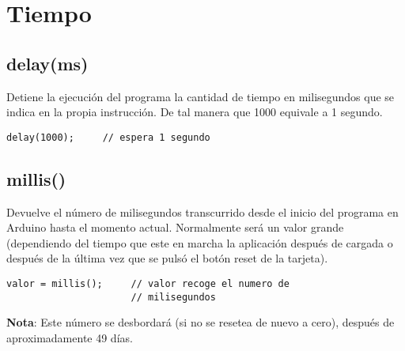 \chapter{Tiempo}
\section{delay(ms)}

Detiene la ejecución del programa la cantidad de tiempo en milisegundos que se indica en la propia instrucción. De tal manera que 1000 equivale a 1 segundo.
\begin{lstlisting}
delay(1000);     // espera 1 segundo
\end{lstlisting}

\section{millis()}

Devuelve el número de milisegundos transcurrido desde el inicio del programa en Arduino hasta el momento actual. Normalmente será un valor grande (dependiendo del tiempo que este en marcha la aplicación después de cargada o después de la última vez que se pulsó el botón reset de la tarjeta).
\begin{lstlisting}
valor = millis();     // valor recoge el numero de
                      // milisegundos
\end{lstlisting}
\textbf{Nota}: Este número se desbordará (si no se resetea de nuevo a cero), después de aproximadamente 49 días.